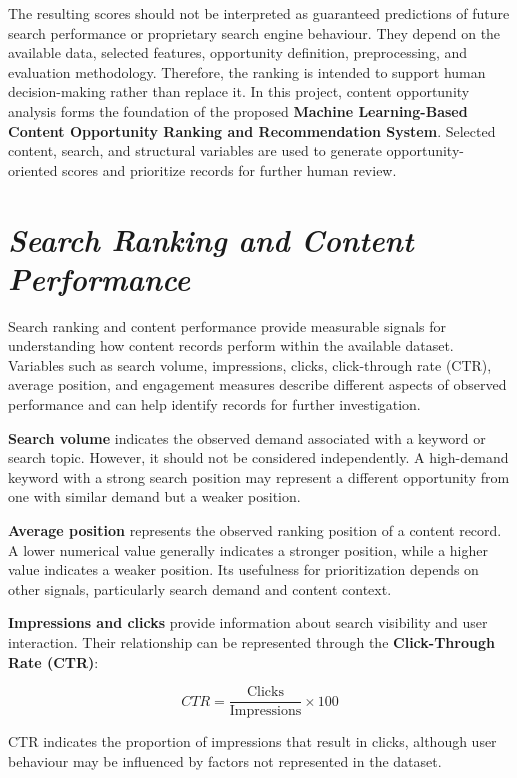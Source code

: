 \documentclass[12pt,a4paper]{report}
\begin{document}
The resulting scores should not be interpreted as guaranteed predictions of future search performance or proprietary search engine behaviour. They depend on the available data, selected features, opportunity definition, preprocessing, and evaluation methodology. Therefore, the ranking is intended to support human decision-making rather than replace it. In this project, content opportunity analysis forms the foundation of the proposed \textbf{Machine Learning-Based Content Opportunity Ranking and Recommendation System}. Selected content, search, and structural variables are used to generate opportunity-oriented scores and prioritize records for further human review.

\section{\textit{Search Ranking and Content Performance}}

Search ranking and content performance provide measurable signals for understanding how content records perform within the available dataset. Variables such as search volume, impressions, clicks, click-through rate (CTR), average position, and engagement measures describe different aspects of observed performance and can help identify records for further investigation.

\textbf{Search volume} indicates the observed demand associated with a keyword or search topic. However, it should not be considered independently. A high-demand keyword with a strong search position may represent a different opportunity from one with similar demand but a weaker position.

\textbf{Average position} represents the observed ranking position of a content record. A lower numerical value generally indicates a stronger position, while a higher value indicates a weaker position. Its usefulness for prioritization depends on other signals, particularly search demand and content context.

\textbf{Impressions and clicks} provide information about search visibility and user interaction. Their relationship can be represented through the \textbf{Click-Through Rate (CTR)}:

\begin{equation}
CTR = \frac{\text{Clicks}}{\text{Impressions}} \times 100
\label{eq:ctr}
\end{equation}

CTR indicates the proportion of impressions that result in clicks, although user behaviour may be influenced by factors not represented in the dataset.
\end{document}
